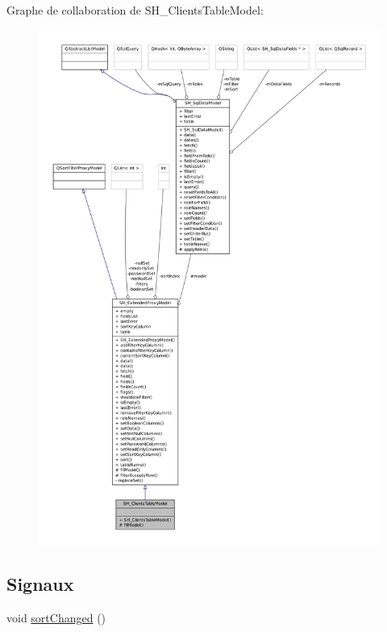 Graphe de collaboration de S\-H\-\_\-\-Clients\-Table\-Model\-:\nopagebreak
\begin{figure}[H]
\begin{center}
\leavevmode
\includegraphics[width=350pt]{classSH__ClientsTableModel__coll__graph}
\end{center}
\end{figure}
\subsection*{Signaux}
\begin{DoxyCompactItemize}
\item 
void \hyperlink{classSH__ExtendedProxyModel_ad34f69425d6c86a2671cf9f85562a724}{sort\-Changed} ()
\end{DoxyCompactItemize}
